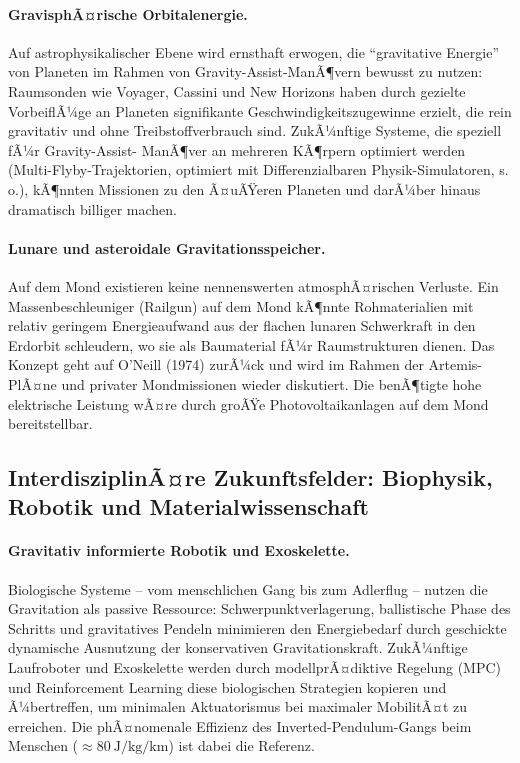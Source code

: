 ﻿\documentclass[12pt, a4paper]{report}
\theoremstyle{definition}
\theoremstyle{remark}
\begin{document}
\paragraph{GravisphÃ¤rische Orbitalenergie.}
Auf astrophysikalischer Ebene wird ernsthaft erwogen, die ``gravitative Energie''
von Planeten im Rahmen von Gravity-Assist-ManÃ¶vern bewusst zu nutzen: Raumsonden
wie Voyager, Cassini und New Horizons haben durch gezielte VorbeiflÃ¼ge an Planeten
signifikante Geschwindigkeitszugewinne erzielt, die rein gravitativ und ohne
Treibstoffverbrauch sind. ZukÃ¼nftige Systeme, die speziell fÃ¼r Gravity-Assist-
ManÃ¶ver an mehreren KÃ¶rpern optimiert werden (Multi-Flyby-Trajektorien, optimiert
mit Differenzialbaren Physik-Simulatoren, s.\,o.), kÃ¶nnten Missionen zu den
Ã¤uÃŸeren Planeten und darÃ¼ber hinaus dramatisch billiger machen.

\paragraph{Lunare und asteroidale Gravitationsspeicher.}
Auf dem Mond existieren keine nennenswerten atmosphÃ¤rischen Verluste. Ein
Massenbeschleuniger (Railgun) auf dem Mond kÃ¶nnte Rohmaterialien mit relativ
geringem Energieaufwand aus der flachen lunaren Schwerkraft in den Erdorbit
schleudern, wo sie als Baumaterial fÃ¼r Raumstrukturen dienen. Das Konzept geht
auf O'Neill (1974) zurÃ¼ck und wird im Rahmen der Artemis-PlÃ¤ne und privater
Mondmissionen wieder diskutiert. Die benÃ¶tigte hohe elektrische Leistung wÃ¤re
durch groÃŸe Photovoltaikanlagen auf dem Mond bereitstellbar.

\subsection{InterdisziplinÃ¤re Zukunftsfelder: Biophysik, Robotik und
               Materialwissenschaft}

\paragraph{Gravitativ informierte Robotik und Exoskelette.}
Biologische Systeme -- vom menschlichen Gang bis zum Adlerflug -- nutzen die
Gravitation als passive Ressource: Schwerpunktverlagerung, ballistische Phase
des Schritts und gravitatives Pendeln minimieren den Energiebedarf durch
geschickte dynamische Ausnutzung der konservativen Gravitationskraft. ZukÃ¼nftige
Laufroboter und Exoskelette werden durch modellprÃ¤diktive Regelung (MPC) und
Reinforcement Learning diese biologischen Strategien kopieren und Ã¼bertreffen,
um minimalen Aktuatorismus bei maximaler MobilitÃ¤t zu erreichen. Die phÃ¤nomenale
Effizienz des Inverted-Pendulum-Gangs beim Menschen ($\approx \SI{80}{\joule\per\kilogram\per\kilo\metre}$)
ist dabei die Referenz.
\end{document}
